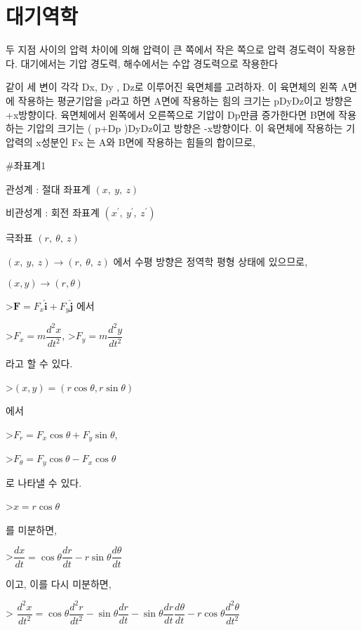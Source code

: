 \section{대기역학}



두 지점 사이의 압력 차이에 의해 압력이 큰 쪽에서 작은 쪽으로 압력 경도력이 작용한다. 대기에서는 기압 경도력, 해수에서는 수압 경도력으로 작용한다


같이 세 변이 각각 Dx, Dy , Dz로 이루어진 육면체를 고려하자. 이 육면체의 왼쪽 A면에
작용하는 평균기압을 p라고 하면 A면에 작용하는 힘의 크기는 pDyDz이고 방향은 +x방향이다. 육면체에서
왼쪽에서 오른쪽으로 기압이 Dp만큼 증가한다면 B면에 작용하는 기압의 크기는 ( p+Dp )DyDz이고
방향은 -x방향이다. 이 육면체에 작용하는 기압력의 x성분인 Fx 는 A와 B면에 작용하는 힘들의 합이므로,


#좌표계1

관성계 : 절대 좌표계 $ (x,~y,~z)$

비관성계 : 회전 좌표계 $ (x^{\prime},~y^{\prime},~z^{\prime})$ 

극좌표 $ (r,~\theta,~z)$


$ (x,~y,~z) 	\rightarrow (r,~\theta,~z)$ 
에서 수평 방향은 정역학 평형 상태에 있으므로, 

$ (x, y) 	\rightarrow (r, \theta)$

>$ \mathbf{F} = F_{x} \mathbf{\hat{i}}  + F_{y} \mathbf{\hat{j}} $ 
에서 

>$ F_{x} = m \dfrac{d^{2}x}{dt^{2}}$, 
>$ F_{y} = m \dfrac{d^{2}y}{dt^{2}}$ 

라고 할 수 있다. 

>$ (x, y) = (r \cos \theta, r \sin \theta)$ 

에서

>$ F_{r} = F_{x} \cos \theta + F_{y} \sin \theta $, 

>$ F_{\theta} = F_{y} \cos \theta - F_{x} \cos \theta $ 

로 나타낼 수 있다. 

>$ x = r \cos \theta $

를 미분하면, 

>$\dfrac{dx}{dt} = \cos \theta \dfrac{dr}{dt} - r \sin \theta \dfrac{d\theta}{dt}$ 

이고, 이를 다시 미분하면, 

> $\dfrac{d^{2}x}{dt^{2}} = \cos \theta \dfrac{d^{2}r}{dt^{2}} - \sin \theta \dfrac{dr}{dt} - \sin \theta \dfrac{dr}{dt} \dfrac{d\theta}{dt} -r \cos \theta \dfrac{d^{2}\theta}{dt^{2}}$

